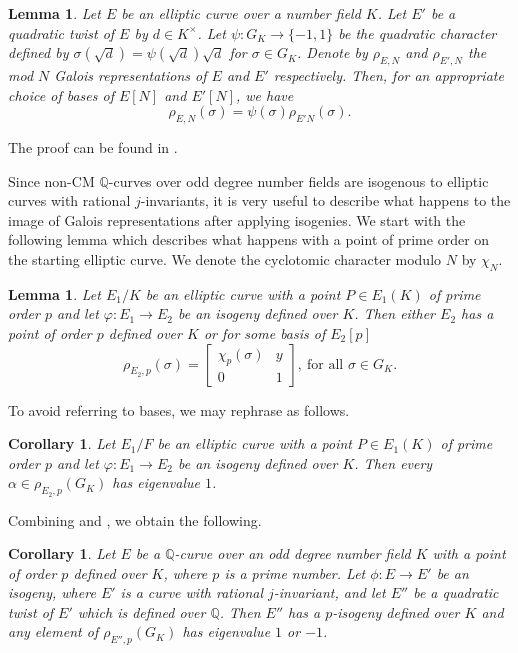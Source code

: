 \documentclass[10pt,leqno]{amsart}
\newcommand\m[1]{\begin{bmatrix}#1\end{bmatrix}}
\newcommand{\Q}{\mathbb{Q}}
\newtheorem{lemma}[theorem]{Lemma}
\newtheorem{corollary}[theorem]{Corollary}
\theoremstyle{definition}
\theoremstyle{remark}
\numberwithin{theorem}{section}
\begin{document}
\begin{lemma}\label{twistanje}
    Let $E$ be an elliptic curve over a number field $K$. Let $E'$ be a quadratic twist of $E$ by $d \in K^\times$. Let $\psi:G_K \to \{-1, 1\}$ be the quadratic character defined by $\sigma(\sqrt{d})=\psi(\sqrt d) \sqrt d$ for $\sigma \in G_K$. Denote by $\rho_{E, N}$ and $\rho_{E', N}$ the mod $N$ Galois representations of $E$ and $E'$ respectively. Then, for an appropriate choice of bases of $E[N]$ and $E'[N]$, we have $$\rho_{E, N}(\sigma)=\psi(\sigma)\rho_{E'N}(\sigma).$$
\end{lemma}
The proof can be found in \cite[Lemma 5.1]{siksek2019}.

Since non-CM $\Q$-curves over odd degree number fields are isogenous to elliptic curves with rational $j$-invariants, it is very useful to describe what happens to the image of Galois representations after applying isogenies. We start with the following lemma which describes what happens with a point of prime order on the starting elliptic curve. We denote the cyclotomic character modulo $N$ by $\chi_N$. 

\begin{lemma}\cite[Lemma 4.2.]{bourdon-najman}\label{tocka-prostog-reda}
    Let $E_1/K$ be an elliptic curve with a point $P \in E_1(K)$ of prime order $p$ and let $\varphi: E_1 \to E_2$ be an isogeny defined over $K$. Then either $E_2$ has a point of order $p$ defined over $K$ or for some basis of $E_2[p]$ $$\rho_{E_2, p}(\sigma)=\m{\chi_p(\sigma) & y \\
    0 & 1}, \ \text{for all } \sigma \in G_K.$$ 
\end{lemma}

To avoid referring to bases, we may rephrase  as follows.

\begin{corollary}\label{eigen1}
     Let $E_1/F$ be an elliptic curve with a point $P \in E_1(K)$ of prime order $p$ and let $\varphi: E_1 \to E_2$ be an isogeny defined over $K$. Then every $\alpha \in \rho_{E_2, p}(G_K)$ has eigenvalue $1$.
\end{corollary}

Combining   and , we obtain the following. 

\begin{corollary}\label{izogenija i eigen+-1}
    Let $E$ be a $\Q$-curve over an odd degree number field $K$ with a point of order $p$ defined over $K$, where $p$ is a prime number. Let $\phi:E\to E'$ be an isogeny, where $E'$ is a curve with rational $j$-invariant, and let $E''$ be a quadratic twist of $E'$ which is defined over $\Q$. Then $E''$ has a $p$-isogeny defined over $K$ and any element of $\rho_{E'',p}(G_K)$ has eigenvalue $1$ or $-1$.
\end{corollary}
\end{document}
